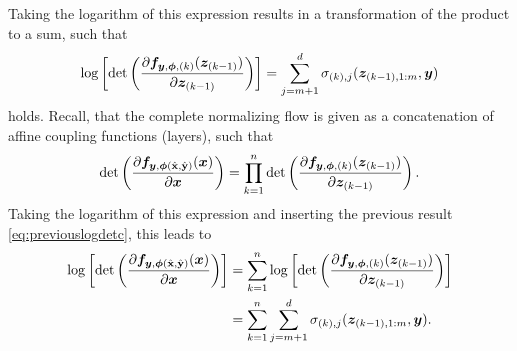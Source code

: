 \documentclass[a4paper,12pt]{report}
\begin{document}
\begin{equation}
\end{equation} Taking the logarithm of this expression results in a transformation of the product to a sum, such that \begin{equation}\label{eq:previouslogdetc}
\log\left[\det\left(\frac{\partial \bm{f}_{\bm{y},\bm{\phi},(k)}(\bm{z}_{(k-1)})}{\partial \bm{z}_{(k-1)}}\right)\right] = \sum_{j = m+1}^{d}\sigma_{(k),j}(\bm{z}_{(k-1),1:m},\bm{y})
\end{equation} holds. Recall, that the complete normalizing flow is given as a concatenation of affine coupling functions (layers), such that \begin{gather}
\begin{gathered}
\det\left(\frac{\partial \bm{f}_{\bm{y},\bm{\phi}(\hat{\boldsymbol{\mathbf{x}}},\hat{\boldsymbol{\mathbf{y}}})}(\bm{x})}{\partial \bm{x}}\right) = \prod_{k = 1}^{n}\det\left(\frac{\partial \bm{f}_{\bm{y},\bm{\phi},(k)}(\bm{z}_{(k-1)})}{\partial \bm{z}_{(k-1)}}\right).
\end{gathered}
\end{gather} Taking the logarithm of this expression and inserting the previous result \cref{eq:previouslogdetc}, this  leads to \begin{align}\label{eq:finallogdetaffinecouplingc}
\begin{aligned}
\log\left[\det\left(\frac{\partial \bm{f}_{\bm{y},\bm{\phi}(\hat{\boldsymbol{\mathbf{x}}},\hat{\boldsymbol{\mathbf{y}}})}(\bm{x})}{\partial \bm{x}}\right)\right] &= \sum_{k = 1}^{n}\log\left[\det\left(\frac{\partial \bm{f}_{\bm{y},\bm{\phi},(k)}(\bm{z}_{(k-1)})}{\partial \bm{z}_{(k-1)}}\right)\right] \\
&= \sum_{k = 1}^{n}\sum_{j = m+1}^{d}\sigma_{(k),j}(\bm{z}_{(k-1),1:m},\bm{y}).
\end{aligned}
\end{align}
\end{document}
